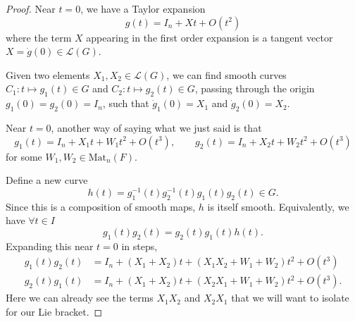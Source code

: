 \begin{proof}
  Near $t = 0$, we have a Taylor expansion
  \begin{equation}
    g(t) = I_n + X t + O(t^2)
  \end{equation}
  where the term $X$ appearing in the first order expansion is a tangent vector $X = \dot g(0) \in \mathscr{L}(G)$.

  Given two elements $X_1, X_2 \in \mathscr{L}(G)$, we can find smooth curves $C_1: t \mapsto g_1(t) \in G$ and $C_2: t \mapsto g_2(t) \in G$, passing through the origin $g_1(0) = g_2(0) = I_n$, such that $\dot g_1(0) = X_1$ and $\dot g_2(0) = X_2$.

  Near $t = 0$, another way of saying what we just said is that
  \begin{equation}
    g_1(t) = I_n + X_1 t + W_1 t^2 + O(t^3), \qquad
    g_2(t) = I_n + X_2 t + W_2 t^2 + O(t^3)
  \end{equation}
  for some $W_1, W_2 \in \text{Mat}_n (F)$.

  Define a new curve
  \begin{equation}
    h(t) = g_1^{-1}(t) g_2^{-1}(t) g_1(t) g_2(t) \in G.
  \end{equation}
  Since this is a composition of smooth maps, $h$ is itself smooth.
  Equivalently, we have $\forall t \in I$
  \begin{equation}
    \label{eq:h}
    g_1(t)g_2(t) = g_2(t) g_1(t) h(t).
  \end{equation}
  Expanding this near $t=0$ in steps,
  \begin{align}
    g_1(t) g_2(t) &= I_n + (X_1 + X_2)t + (X_1 X_2 + W_1 + W_2) t^2 + O(t^3) \\
    g_2(t) g_1(t) &= I_n + (X_1 + X_2)t + (X_2 X_1 + W_1 + W_2) t^2 + O(t^3).
  \end{align}
  Here we can already see the terms $X_1 X_2$ and $X_2 X_1$ that we will want to isolate for our Lie bracket.


\end{proof}
